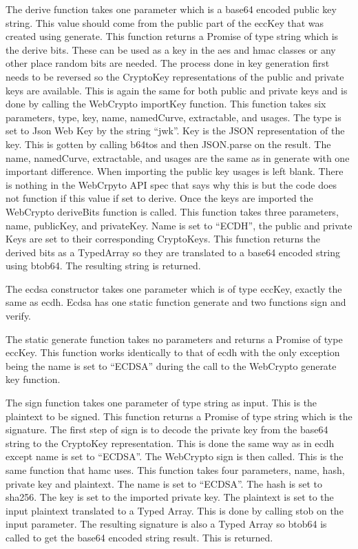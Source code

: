 The derive function takes one parameter which is a base64 encoded public key string. This value should come from the public part of the eccKey that was created using generate. This function returns a Promise of type string which is the derive bits. These can be used as a key in the aes and hmac classes or any other place random bits are needed. The process done in key generation first needs to be reversed so the CryptoKey representations of the public and private keys are available. This is again the same for both public and private keys and is done by calling the WebCrypto importKey function. This function takes six parameters, type, key, name, namedCurve, extractable, and usages. The type is set to Json Web Key by the string “jwk”. Key is the JSON representation of the key. This is gotten by calling b64tos and then JSON.parse on the result. The name, namedCurve, extractable, and usages are the same as in generate with one important difference. When importing the public key usages is left blank. There is nothing in the WebCrpyto API spec that says why this is but the code does not function if this value if set to derive. Once the keys are imported the WebCrypto deriveBits function is called. This function takes three parameters, name, publicKey, and privateKey. Name is set to “ECDH”, the public and private Keys are set to their corresponding CryptoKeys. This function returns the derived bits as a TypedArray so they are translated to a base64 encoded string using btob64. The resulting string is returned.


The ecdsa constructor takes one parameter which is of type eccKey, exactly the same as ecdh. Ecdsa has one static function generate and two functions sign and verify.


The static generate function takes no parameters and returns a Promise of type eccKey. This function works identically to that of ecdh with the only exception being the name is set to “ECDSA” during the call to the WebCrypto generate key function.


The sign function takes one parameter of type string as input. This is the plaintext to be signed. This function returns a Promise of type string which is the signature. The first step of sign is to decode the private key from the base64 string to the CryptoKey representation. This is done the same way as in ecdh except name is set to “ECDSA”. The WebCrypto sign is then called. This is the same function that hamc uses. This function takes four parameters, name, hash, private key and plaintext. The name is set to “ECDSA”. The hash is set to sha256. The key is set to the imported private key. The plaintext is set to the input plaintext translated to a Typed Array. This is done by calling stob on the input parameter. The resulting signature is also a Typed Array so btob64 is called to get the base64 encoded string result. This is returned.


